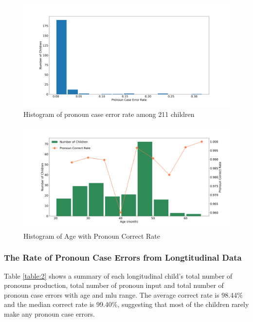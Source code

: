 \FloatBarrier
\begin{figure}[h]
\centering
\includegraphics[scale = 0.35]{graph/OverallErrorRate.png}
\vspace{-3em}
\caption{Histogram of pronoun case error rate among 211 children}
\label{fig:212}
\end{figure}
\FloatBarrier
\begin{figure}[h]
\centering
    \includegraphics[scale =0.35] {graph/Crosssectional.png}
    \vspace{-3em}
    \caption{Histogram of Age with Pronoun Correct Rate}
    \label{fig:cross}
\end{figure}
\subsubsection{The Rate of Pronoun Case Errors from Longtitudinal Data}
Table \ref{table:2} shows a summary of each longitudinal child's total number of pronouns production, total number of pronoun input and total number of pronoun case errors with age and mlu range. The average correct rate is 98.44\% and the median correct rate is 99.40\%, suggesting that most of the children rarely make any  pronoun case errors. 

